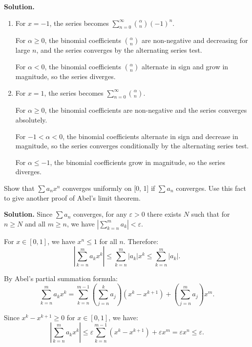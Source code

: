 \noindent\textbf{Solution.}
\begin{enumerate}[label=(\alph*)]
\item For \( x = -1 \), the series becomes \( \sum_{n=0}^\infty \binom{\alpha}{n} (-1)^n \).

For \( \alpha \geq 0 \), the binomial coefficients \( \binom{\alpha}{n} \) are non-negative and decreasing for large \( n \), and the series converges by the alternating series test.

For \( \alpha < 0 \), the binomial coefficients \( \binom{\alpha}{n} \) alternate in sign and grow in magnitude, so the series diverges.

\item For \( x = 1 \), the series becomes \( \sum_{n=0}^\infty \binom{\alpha}{n} \).

For \( \alpha \geq 0 \), the binomial coefficients are non-negative and the series converges absolutely.

For \( -1 < \alpha < 0 \), the binomial coefficients alternate in sign and decrease in magnitude, so the series converges conditionally by the alternating series test.

For \( \alpha \leq -1 \), the binomial coefficients grow in magnitude, so the series diverges.
\end{enumerate}

\begin{problembox}
Show that \( \sum a_n x^n \) converges uniformly on [0, 1] if \( \sum a_n \) converges. Use this fact to give another proof of Abel's limit theorem.
\end{problembox}

\noindent\textbf{Solution.} Since \( \sum a_n \) converges, for any \( \varepsilon > 0 \) there exists \( N \) such that for \( n \geq N \) and all \( m \geq n \), we have \( |\sum_{k=n}^m a_k| < \varepsilon \).

For \( x \in [0, 1] \), we have \( x^n \leq 1 \) for all \( n \). Therefore:
\[\left|\sum_{k=n}^m a_k x^k\right| \leq \sum_{k=n}^m |a_k| x^k \leq \sum_{k=n}^m |a_k|.\]

By Abel's partial summation formula:
\[\sum_{k=n}^m a_k x^k = \sum_{k=n}^{m-1} \left(\sum_{j=n}^k a_j\right)(x^k - x^{k+1}) + \left(\sum_{j=n}^m a_j\right)x^m.\]

Since \( x^k - x^{k+1} \geq 0 \) for \( x \in [0, 1] \), we have:
\[\left|\sum_{k=n}^m a_k x^k\right| \leq \varepsilon \sum_{k=n}^{m-1} (x^k - x^{k+1}) + \varepsilon x^m = \varepsilon x^n \leq \varepsilon.\]

